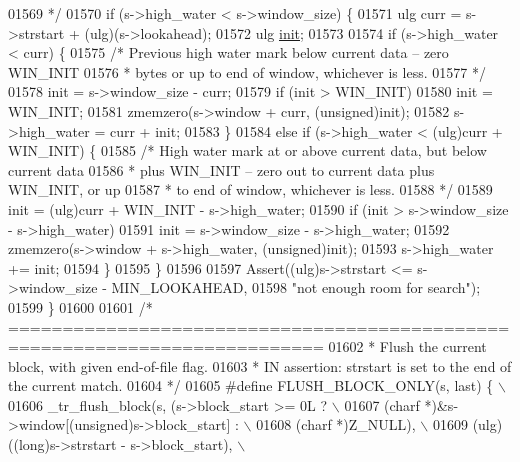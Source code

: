 \begin{DoxyCode}
{{{{{01569 \textcolor{comment}{     */}
01570     \textcolor{keywordflow}{if} (s->high\_water < s->window\_size) \{
01571         ulg curr = s->strstart + (ulg)(s->lookahead);
01572         ulg \hyperlink{structinit}{init};
01573 
01574         \textcolor{keywordflow}{if} (s->high\_water < curr) \{
01575             \textcolor{comment}{/* Previous high water mark below current data -- zero WIN\_INIT}
01576 \textcolor{comment}{             * bytes or up to end of window, whichever is less.}
01577 \textcolor{comment}{             */}
01578             init = s->window\_size - curr;
01579             \textcolor{keywordflow}{if} (init > WIN\_INIT)
01580                 init = WIN\_INIT;
01581             zmemzero(s->window + curr, (\textcolor{keywordtype}{unsigned})init);
01582             s->high\_water = curr + init;
01583         \}
01584         \textcolor{keywordflow}{else} \textcolor{keywordflow}{if} (s->high\_water < (ulg)curr + WIN\_INIT) \{
01585             \textcolor{comment}{/* High water mark at or above current data, but below current data}
01586 \textcolor{comment}{             * plus WIN\_INIT -- zero out to current data plus WIN\_INIT, or up}
01587 \textcolor{comment}{             * to end of window, whichever is less.}
01588 \textcolor{comment}{             */}
01589             init = (ulg)curr + WIN\_INIT - s->high\_water;
01590             if (init > s->window\_size - s->high\_water)
01591                 init = s->window\_size - s->high\_water;
01592             zmemzero(s->window + s->high\_water, (\textcolor{keywordtype}{unsigned})init);
01593             s->high\_water += init;
01594         \}
01595     \}
01596 
01597     Assert((ulg)s->strstart <= s->window\_size - MIN\_LOOKAHEAD,
01598            \textcolor{stringliteral}{"not enough room for search"});
01599 \}
01600 
01601 \textcolor{comment}{/* ===========================================================================}
01602 \textcolor{comment}{ * Flush the current block, with given end-of-file flag.}
01603 \textcolor{comment}{ * IN assertion: strstart is set to the end of the current match.}
01604 \textcolor{comment}{ */}
01605 \textcolor{preprocessor}{#define FLUSH\_BLOCK\_ONLY(s, last) \{ \(\backslash\)}
01606 \textcolor{preprocessor}{   \_tr\_flush\_block(s, (s->block\_start >= 0L ? \(\backslash\)}
01607 \textcolor{preprocessor}{                   (charf *)&s->window[(unsigned)s->block\_start] : \(\backslash\)}
01608 \textcolor{preprocessor}{                   (charf *)Z\_NULL), \(\backslash\)}
01609 \textcolor{preprocessor}{                (ulg)((long)s->strstart - s->block\_start), \(\backslash\)}
}}}}}
\end{DoxyCode}

